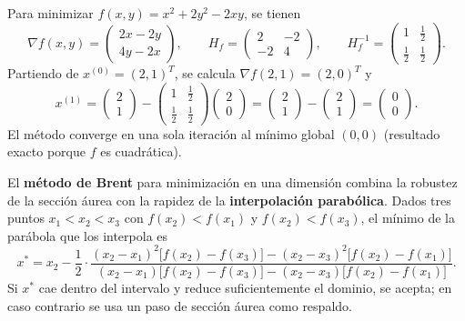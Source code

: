 \documentclass[a4,11pt]{aleph-notas}
\begin{document}
\begin{ejem}
    Para minimizar $f(x,y)=x^2+2y^2-2xy$, se tienen
    \[
        \nabla f(x,y)=
        \begin{pmatrix}
            2x-2y\\
            4y-2x
        \end{pmatrix},
        \qquad
        H_f=
        \begin{pmatrix}
            2 & -2\\
            -2 & 4
        \end{pmatrix},
        \qquad
        H_f^{-1}=
        \begin{pmatrix}
            1 & \tfrac{1}{2}\\[1mm]
            \tfrac{1}{2} & \tfrac{1}{2}
        \end{pmatrix}.
    \]
    Partiendo de ${x}^{(0)}=(2,1)^T$, se calcula $\nabla f(2,1)=(2,0)^T$ y
    \[
        {x}^{(1)}
        =
        \begin{pmatrix}
            2\\1
        \end{pmatrix}
        -
        \begin{pmatrix}
            1 & \tfrac{1}{2}\\[1mm]
            \tfrac{1}{2} & \tfrac{1}{2}
        \end{pmatrix}
        \begin{pmatrix}
            2\\0
        \end{pmatrix}
        =
        \begin{pmatrix}
            2\\1
        \end{pmatrix}
        -
        \begin{pmatrix}
            2\\1
        \end{pmatrix}
        =
        \begin{pmatrix}
            0\\0
        \end{pmatrix}.
    \]
    El método converge en una sola iteración al mínimo global $(0,0)$ (resultado exacto porque $f$ es cuadrática).
\end{ejem}

\begin{defi}
    El \textbf{método de Brent} para minimización en una dimensión combina la robustez de la sección áurea con la rapidez de la \textbf{interpolación parabólica}. Dados tres puntos $x_1<x_2<x_3$ con $f(x_2)<f(x_1)$ y $f(x_2)<f(x_3)$, el mínimo de la parábola que los interpola es
    \[
        x^*
        =
        x_2
        -
        \frac{1}{2}
        \cdot
        \frac{(x_2-x_1)^2\bigl[f(x_2)-f(x_3)\bigr]-(x_2-x_3)^2\bigl[f(x_2)-f(x_1)\bigr]}{(x_2-x_1)\bigl[f(x_2)-f(x_3)\bigr]-(x_2-x_3)\bigl[f(x_2)-f(x_1)\bigr]}.
    \]
    Si $x^*$ cae dentro del intervalo y reduce suficientemente el dominio, se acepta; en caso contrario se usa un paso de sección áurea como respaldo.
\end{defi}
\end{document}
